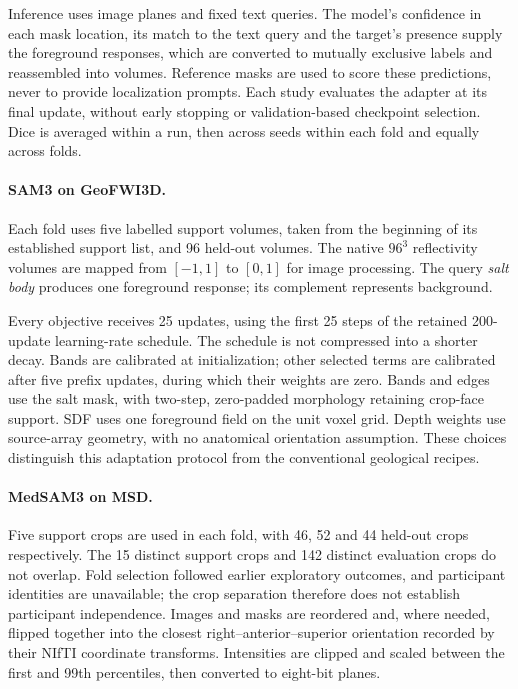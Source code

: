 Inference uses image planes and fixed text queries. The model's confidence
in each mask location, its match to the text query and the target's presence
supply the foreground responses, which are converted to mutually exclusive
labels and reassembled into volumes. Reference masks are used to score these
predictions, never to provide localization prompts. Each study evaluates the
adapter at its final update, without early stopping or validation-based
checkpoint selection. Dice is averaged within a run, then across seeds
within each fold and equally across folds.

\paragraph{SAM3 on GeoFWI3D.}\label{sec:sam3-methods}
Each fold uses five labelled support volumes, taken from the beginning
of its established support list, and 96 held-out volumes. The native
$96^3$ reflectivity volumes are mapped from $[-1,1]$ to $[0,1]$ for
image processing. The query \emph{salt body} produces one foreground
response; its complement represents background.

Every objective receives 25 updates, using the first 25 steps of the
retained 200-update learning-rate schedule. The schedule is not compressed
into a shorter decay. Bands are calibrated at initialization; other selected
terms are calibrated after five prefix updates, during which their weights
are zero. Bands and edges use the salt mask, with two-step, zero-padded
morphology retaining crop-face support. SDF uses one foreground field on the
unit voxel grid. Depth weights use source-array geometry, with no anatomical
orientation assumption. These choices distinguish this adaptation protocol
from the conventional geological recipes.

\paragraph{MedSAM3 on MSD.}\label{sec:medsam-methods}
Five support crops are used in each fold, with 46, 52 and 44 held-out
crops respectively. The 15 distinct support crops and 142 distinct
evaluation crops do not overlap. Fold selection followed earlier
exploratory outcomes, and participant identities are unavailable; the
crop separation therefore does not establish participant independence.
Images and masks are reordered and, where needed, flipped together
into the closest right--anterior--superior orientation recorded by their
NIfTI coordinate transforms. Intensities are clipped and scaled between the first and
99th percentiles, then converted to eight-bit planes.

